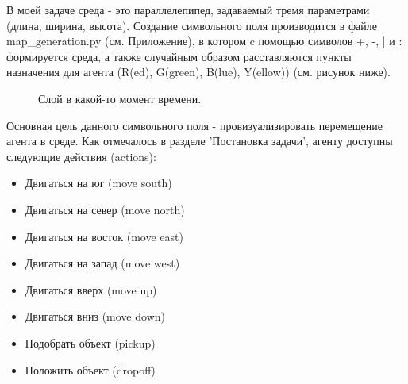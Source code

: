 \documentclass[a4paper]{report}
\theoremstyle{definition}
\theoremstyle{plain}
\theoremstyle{remark}
\theoremstyle{remark}
\theoremstyle{definition}
\begin{document}
В моей задаче среда - это параллелепипед, задаваемый тремя параметрами (длина, ширина, высота). Создание символьного поля производится в файле map\_generation.py (см. Приложение), в котором c помощью символов +, -, | и : формируется среда, а также случайным образом расставляются пункты назначения для агента (R(ed), G(green), B(lue), Y(ellow)) (см. рисунок ниже).
\begin{figure}[H]
	\caption{Слой в какой-то момент времени.}
\end{figure}

Основная цель данного символьного поля - провизуализировать перемещение агента в среде. Как отмечалось в разделе 'Постановка задачи', агенту доступны следующие действия (actions):
\begin{itemize}
\item Двигаться на юг (move south)
\item Двигаться на север (move north)
\item Двигаться на восток (move east)
\item Двигаться на запад (move west)
\item Двигаться вверх (move up)
\item Двигаться вниз (move down)
\item Подобрать объект (pickup)
\item Положить объект (dropoff)
 \end{itemize}
\end{document}
